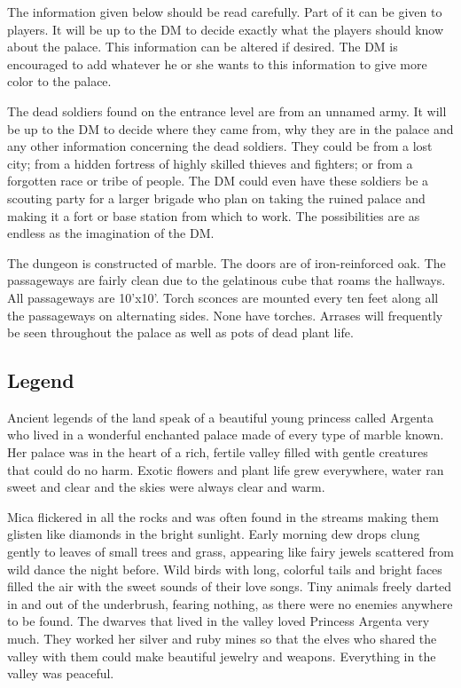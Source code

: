 \documentclass[palace_of_the_silver_princess]{subfiles}
\begin{document}
\selectfont
\clearpage


The information given below should be read carefully. Part of it can be
given to players. It will be up to the DM to decide exactly what the
players should know about the palace. This information can be altered if
desired. The DM is encouraged to add whatever he or she wants to this
information to give more color to the palace.

The dead soldiers found on the entrance level are from an unnamed army.
It will be up to the DM to decide where they came from, why they are in
the palace and any other information concerning the dead soldiers. They
could be from a lost city; from a hidden fortress of highly skilled
thieves and fighters; or from a forgotten race or tribe of people. The
DM could even have these soldiers be a scouting party for a larger
brigade who plan on taking the ruined palace and making it a fort or
base station from which to work. The possibilities are as endless as the
imagination of the DM.

The dungeon is constructed of marble. The doors are of iron-reinforced
oak. The passageways are fairly clean due to the gelatinous cube that
roams the hallways. All passageways are 10’x10’.  Torch sconces are
mounted every ten feet along all the passageways on alternating sides.
None have torches. Arrases will frequently be seen throughout the palace
as well as pots of dead plant life.

\subsection{Legend}

Ancient legends of the land speak of a beautiful young princess called
Argenta who lived in a wonderful enchanted palace made of every type of
marble known. Her palace was in the heart of a rich, fertile valley
filled with gentle creatures that could do no harm.  Exotic flowers and
plant life grew everywhere, water ran sweet and clear and the skies were
always clear and warm.

Mica flickered in all the rocks and was often found in the streams
making them glisten like diamonds in the bright sunlight. Early morning
dew drops clung gently to leaves of small trees and grass, appearing
like fairy jewels scattered from wild dance the night before. Wild birds
with long, colorful tails and bright faces filled the air with the sweet
sounds of their love songs. Tiny animals freely darted in and out of the
underbrush, fearing nothing, as there were no enemies anywhere to be
found. The dwarves that lived in the valley loved Princess Argenta very
much. They worked her silver and ruby mines so that the elves who shared
the valley with them could make beautiful jewelry and weapons.
Everything in the valley was peaceful.
\end{document}
